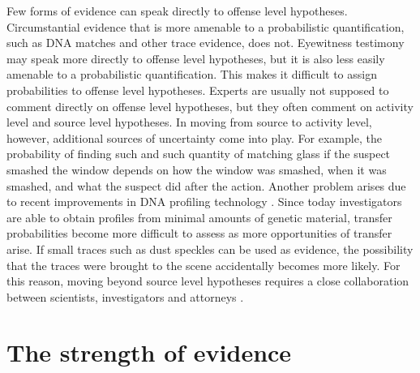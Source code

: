 \documentclass{article}
\begin{document}
Few forms of evidence can speak directly to offense level hypotheses. Circumstantial evidence that is more amenable to a probabilistic quantification, such as DNA matches and other trace evidence, does not. 
Eyewitness testimony may speak more directly to offense level hypotheses, but it is also less easily amenable to a probabilistic quantification. This makes it  difficult to assign probabilities to offense level hypotheses. Experts are usually not supposed to comment directly on offense level hypotheses, but they often comment on activity level  and source level hypotheses. In moving from source to activity level, however, additional sources of uncertainty come into play. %
For example, the probability of finding such and such quantity of matching glass if the suspect smashed the window depends on how the window was smashed, when it was smashed, and what the suspect did after the action.   Another problem arises due to recent improvements in DNA profiling technology \citep{Cook1998hierarchy}.  Since today investigators are able to obtain profiles from minimal amounts of genetic material,  transfer probabilities become more difficult to assess as more opportunities of transfer arise. If small traces such as dust speckles can be used as evidence, the possibility that the traces were  brought to the scene accidentally becomes more likely. For this reason, moving beyond source level hypotheses requires a close collaboration  between scientists, investigators and attorneys \citep[see][for a discussion]{Cook1998hierarchy}. 

% 
%
%
%
%




\section{The strength of evidence}
\label{sec:LR}
\end{document}
